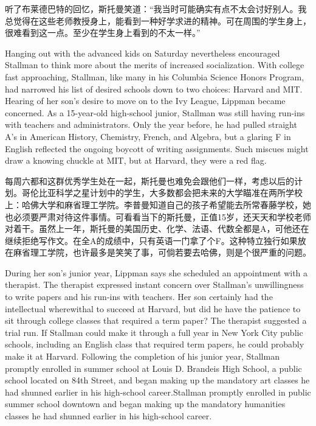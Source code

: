 \ifdefined\chs
听了布莱德巴特的回忆，斯托曼笑道：``我当时可能确实有点不太会讨好别人。我总觉得在这些老师教授身上，能看到一种好学求进的精神。可在周围的学生身上，很难看到这一点。至少在学生身上看到的不太一样。''
\fi

\ifdefined\eng
Hanging out with the advanced kids on Saturday nevertheless encouraged Stallman to think more about the merits of increased socialization. With college fast approaching, Stallman, like many in his Columbia Science Honors Program, had narrowed his list of desired schools down to two choices: Harvard and MIT. Hearing of her son's desire to move on to the Ivy League, Lippman became concerned. As a 15-year-old high-school junior, Stallman was still having run-ins with teachers and administrators. Only the year before, he had pulled straight A's in American History, Chemistry, French, and Algebra, but a glaring F in English reflected the ongoing boycott of writing assignments. Such miscues might draw a knowing chuckle at MIT, but at Harvard, they were a red flag.
\fi

\ifdefined\chs
每周六都和这群优秀学生处在一起，斯托曼也难免会跟他们一样，考虑以后的计划。哥伦比亚科学之星计划中的学生，大多数都会把未来的大学瞄准在两所学校上：哈佛大学和麻省理工学院。李普曼知道自己的孩子希望能去所常春藤学校，她也必须要严肃对待这件事情。可看看当下的斯托曼，正值15岁，还天天和学校老师对着干。虽然上一年，斯托曼的美国历史、化学、法语、代数全都是A，可他还在继续拒绝写作文。在全A的成绩中，只有英语一门拿了个F。这种特立独行如果放在麻省理工学院，也许最多是笑笑了事，可倘若要去哈佛，则是个很严重的问题。
\fi

\ifdefined\eng
During her son's junior year, Lippman says she scheduled an appointment with a therapist. The therapist expressed instant concern over Stallman's unwillingness to write papers and his run-ins with teachers. Her son certainly had the intellectual wherewithal to succeed at Harvard, but did he have the patience to sit through college classes that required a term paper? The therapist suggested a trial run. If Stallman could make it through a full year in New York City public schools, including an English class that required term papers, he could probably make it at Harvard. Following the completion of his junior year, \ifdefined\vone Stallman promptly enrolled in summer school at Louis D. Brandeis High School, a public school located on 84th Street, and began making up the mandatory art classes he had shunned earlier in his high-school career.\fi\ifdefined\vtwo Stallman promptly enrolled in public summer school downtown and began making up the mandatory humanities classes he had shunned earlier in his high-school career.\fi
\fi

